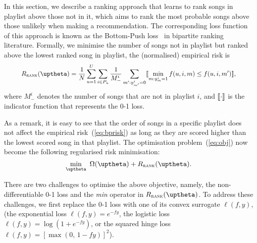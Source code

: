 In this section, we describe a ranking approach that learns to rank songs in playlist above
those not in it, which aims to rank the most probable songs above those unlikely when making a recommendation.
The corresponding loss function of this approach is known as the Bottom-Push loss~\cite{rudin2009p} in bipartite ranking literature.
Formally, we minimise the number of songs not in playlist but ranked above the lowest ranked song in playlist,
\ie the (normalised) empirical risk is
\begin{equation}
\label{eq:bprisk}
\resizebox{.9\linewidth}{!}{$\displaystyle
R_\textsc{rank}(\uptheta) = \frac{1}{N} \sum_{u=1}^U \sum_{i \in P_u} \frac{1}{M_-^i} \sum_{m': y_{m'}^i = 0} 
\llb \min_{m: y_m^i = 1} f(u, i, m) \le f(u, i, m') \rrb,
$}
\end{equation}
where $M_-^i$ denotes the number of songs that are not in playlist $i$,
and $\llbracket \cdot \rrbracket$ is the indicator function that represents the 0-1 loss.

As a remark, it is easy to see that the order of songs in a specific playlist does not affect the empirical 
risk~(\ref{eq:bprisk}) as long as they are scored higher than the lowest scored song in that playlist.
The optimisation problem~(\ref{eq:obj}) now become the following regularised risk minimisation:
\begin{equation}
\label{eq:obj_rank}
\min_\uptheta \ \Omega(\uptheta) + R_\textsc{rank}(\uptheta).
\end{equation}

There are two challenges to optimise the above objective,
namely, the non-differentiable 0-1 loss and the \emph{min} operator in $R_\textsc{rank}(\uptheta)$.
To address these challenges, we first replace the 0-1 loss with one of its convex surrogate $\ell(f, y)$,
(\eg the exponential loss $\ell(f, y) = e^{-fy}$, the logistic loss $\ell(f, y) = \log(1 + e^{-fy})$,
or the squared hinge loss $\ell(f, y) = [\max(0, \, 1 - fy)]^2$).




